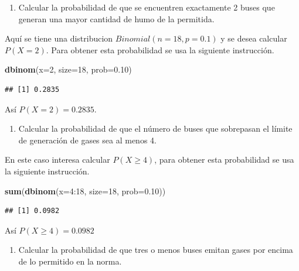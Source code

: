 \documentclass[10pt,]{krantz}
\makeatletter
\newenvironment{Shaded}{\begin{snugshade}}{\end{snugshade}}
\newcommand{\KeywordTok}[1]{\textcolor[rgb]{0.13,0.29,0.53}{\textbf{{#1}}}}
\newcommand{\DataTypeTok}[1]{\textcolor[rgb]{0.13,0.29,0.53}{{#1}}}
\newcommand{\DecValTok}[1]{\textcolor[rgb]{0.00,0.00,0.81}{{#1}}}
\newcommand{\FloatTok}[1]{\textcolor[rgb]{0.00,0.00,0.81}{{#1}}}
\newcommand{\NormalTok}[1]{{#1}}
\providecommand{\tightlist}{%
  \setlength{\itemsep}{0pt}\setlength{\parskip}{0pt}}
\newenvironment{kframe}{%
\medskip{}
\setlength{\fboxsep}{.8em}
 \def\at@end@of@kframe{}%
 \ifinner\ifhmode%
  \def\at@end@of@kframe{\end{minipage}}%
  \begin{minipage}{\columnwidth}%
 \fi\fi%
 \def\FrameCommand##1{\hskip\@totalleftmargin \hskip-\fboxsep
 \colorbox{shadecolor}{##1}\hskip-\fboxsep
     \hskip-\linewidth \hskip-\@totalleftmargin \hskip\columnwidth}%
 \MakeFramed {\advance\hsize-\width
   \@totalleftmargin\z@ \linewidth\hsize
   \@setminipage}}%
 {\par\unskip\endMakeFramed%
 \at@end@of@kframe}
\renewenvironment{Shaded}{\begin{kframe}}{\end{kframe}}
\makeatother
\begin{document}
\begin{enumerate}
\def\labelenumi{\arabic{enumi})}
\tightlist
\item
  Calcular la probabilidad de que se encuentren exactamente 2 buses que
  generan una mayor cantidad de humo de la permitida.
\end{enumerate}

Aquí se tiene una distribucion \(Binomial(n=18, p=0.1)\) y se desea
calcular \(P(X=2)\). Para obtener esta probabilidad se usa la siguiente
instrucción.

\begin{Shaded}
\begin{Highlighting}[]
\KeywordTok{dbinom}\NormalTok{(}\DataTypeTok{x=}\DecValTok{2}\NormalTok{, }\DataTypeTok{size=}\DecValTok{18}\NormalTok{, }\DataTypeTok{prob=}\FloatTok{0.10}\NormalTok{)}
\end{Highlighting}
\end{Shaded}

\begin{verbatim}
## [1] 0.2835
\end{verbatim}

Así \(P(X=2)=0.2835\).

\begin{enumerate}
\def\labelenumi{\arabic{enumi})}
\setcounter{enumi}{1}
\tightlist
\item
  Calcular la probabilidad de que el número de buses que sobrepasan el
  límite de generación de gases sea al menos 4.
\end{enumerate}

En este caso interesa calcular \(P(X \geq 4)\), para obtener esta
probabilidad se usa la siguiente instrucción.

\begin{Shaded}
\begin{Highlighting}[]
\KeywordTok{sum}\NormalTok{(}\KeywordTok{dbinom}\NormalTok{(}\DataTypeTok{x=}\DecValTok{4}\NormalTok{:}\DecValTok{18}\NormalTok{, }\DataTypeTok{size=}\DecValTok{18}\NormalTok{, }\DataTypeTok{prob=}\FloatTok{0.10}\NormalTok{))}
\end{Highlighting}
\end{Shaded}

\begin{verbatim}
## [1] 0.0982
\end{verbatim}

Así \(P(X \geq 4)=0.0982\)

\begin{enumerate}
\def\labelenumi{\arabic{enumi})}
\setcounter{enumi}{2}
\tightlist
\item
  Calcular la probabilidad de que tres o menos buses emitan gases por
  encima de lo permitido en la norma.
\end{enumerate}
\end{document}
